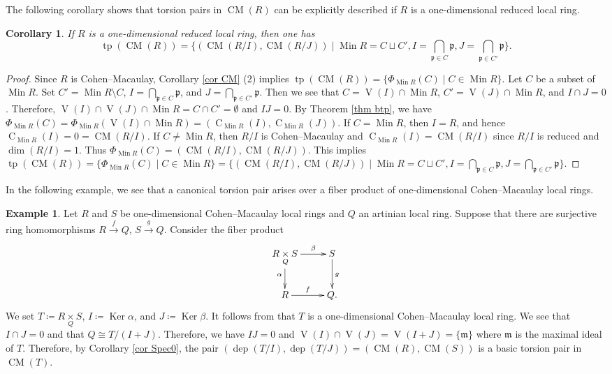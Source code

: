 \documentclass{amsart}
\newtheorem{cor}[thm]{Corollary}
\theoremstyle{definition}
\newtheorem{ex}[thm]{Example}
\theoremstyle{remark}
\def\CC{\operatorname{C}}
\def\CM{\operatorname{CM}}
\def\dep{\operatorname{dep}}
\def\dim{\operatorname{dim}}
\def\Ker{\operatorname{Ker}}
\def\m{\mathfrak{m}}
\def\Min{\operatorname{Min}}
\def\p{\mathfrak{p}}
\def\tp{\operatorname{tp}}
\def\V{\operatorname{V}}
\begin{document}
The following corollary shows that torsion pairs in $\CM(R)$ can be explicitly described if $R$ is a one-dimensional reduced local ring.

\begin{cor}
If $R$ is a one-dimensional reduced local ring, then one has 
$$\tp(\CM(R))=\{(\CM(R/I),\CM(R/J))\mid\Min R=C\sqcup C', I=\bigcap_{\p\in C}\p,J=\bigcap_{\p\in C'}\p\}.$$
\end{cor}

\begin{proof}
Since $R$ is Cohen--Macaulay, Corollary \ref{cor CM} (2) implies $\tp(\CM(R))=\{\Phi_{\Min R}(C)\mid C\in\Min R\}$. Let $C$ be a subset of $\Min R$. Set $C'=\Min R\setminus C$, $I=\bigcap_{\p\in C}\p$, and $J=\bigcap_{\p\in C'}\p$. Then we see that $C=\V(I)\cap\Min R$, $C'=\V(J)\cap\Min R$, and $I\cap J=0$. Therefore, $\V(I)\cap\V(J)\cap\Min R=C\cap C'=\emptyset$ and $IJ=0$. By Theorem \ref{thm btp}, we have $\Phi_{\Min R}(C)=\Phi_{\Min R}(\V(I)\cap\Min R)=(\CC_{\Min R}(I),\CC_{\Min R}(J))$. If $C=\Min R$, then $I=R$, and hence $\CC_{\Min R}(I)=0=\CM(R/I)$. If $C\ne\Min R$, then $R/I$ is Cohen--Macaulay and $\CC_{\Min R}(I)=\CM(R/I)$ since $R/I$ is reduced and $\dim (R/I)=1$. Thus $\Phi_{\Min R}(C)=(\CM(R/I),\CM(R/J))$. This implies $\tp(\CM(R))=\{\Phi_{\Min R}(C)\mid C\in\Min R\}=\{(\CM(R/I),\CM(R/J))\mid\Min R=C\sqcup C', I=\bigcap_{\p\in C}\p,J=\bigcap_{\p\in C'}\p\}$.
\end{proof}

In the following example, we see that a canonical torsion pair arises over a fiber product of one-dimensional Cohen--Macaulay local rings.

\begin{ex}
Let $R$ and $S$ be one-dimensional Cohen--Macaulay local rings and $Q$ an artinian local ring. Suppose that there are surjective ring homomorphisms $R\overset{f}\to Q$, $S\overset{g}\to Q$. Consider the fiber product
\[\xymatrix{
R\underset{Q}\times S\ar[r]^-\beta\ar[d]_\alpha&S\ar[d]^g\\
R\ar[r]^-f&Q
.}\]
We set $T\coloneq R\underset{Q}\times S$, $I\coloneq\Ker\alpha$, and $J\coloneq\Ker\beta$. It follows from \cite[Lemmas 1.2 and 1.5]{AAM} that $T$ is a one-dimensional Cohen--Macaulay local ring. We see that $I\cap J=0$ and that $Q\cong T/(I+J)$. Therefore, we have $IJ=0$ and $\V(I)\cap\V(J)=\V(I+J)=\{\m\}$ where $\m$ is the maximal ideal of $T$. Therefore, by Corollary \ref{cor Spec0}, the pair $(\dep(T/I),\dep(T/J))=(\CM(R),\CM(S))$ is a basic torsion pair in $\CM(T)$.
\end{ex}
\end{document}
